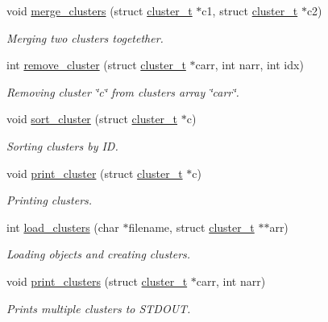\begin{DoxyCompactItemize}
void \mbox{\hyperlink{group___cluster_operations_gac39a25fdec1f4952ec92ee5407893158}{merge\+\_\+clusters}} (struct \mbox{\hyperlink{structcluster__t}{cluster\+\_\+t}} $\ast$c1, struct \mbox{\hyperlink{structcluster__t}{cluster\+\_\+t}} $\ast$c2)
\begin{DoxyCompactList}\small\item\em Merging two clusters togetether. \end{DoxyCompactList}\item 
int \mbox{\hyperlink{group___cluster_operations_gaf73744f9128e4605127b40932a730a48}{remove\+\_\+cluster}} (struct \mbox{\hyperlink{structcluster__t}{cluster\+\_\+t}} $\ast$carr, int narr, int idx)
\begin{DoxyCompactList}\small\item\em Removing cluster \char`\"{}c\char`\"{} from clusters array \char`\"{}carr\char`\"{}. \end{DoxyCompactList}\item 
void \mbox{\hyperlink{group___cluster_operations_ga12718af9e3e31b61bf703ec260e22450}{sort\+\_\+cluster}} (struct \mbox{\hyperlink{structcluster__t}{cluster\+\_\+t}} $\ast$c)
\begin{DoxyCompactList}\small\item\em Sorting clusters by ID. \end{DoxyCompactList}\item 
void \mbox{\hyperlink{group___cluster_operations_ga322bfd43ab7a3fa830cd69e79b7eef06}{print\+\_\+cluster}} (struct \mbox{\hyperlink{structcluster__t}{cluster\+\_\+t}} $\ast$c)
\begin{DoxyCompactList}\small\item\em Printing clusters. \end{DoxyCompactList}\item 
int \mbox{\hyperlink{group___cluster_operations_ga9d928923d43120cb53ddff210a087061}{load\+\_\+clusters}} (char $\ast$filename, struct \mbox{\hyperlink{structcluster__t}{cluster\+\_\+t}} $\ast$$\ast$arr)
\begin{DoxyCompactList}\small\item\em Loading objects and creating clusters. \end{DoxyCompactList}\item 
void \mbox{\hyperlink{group___cluster_operations_gad350e6021e5fead00ff2eeec4d134525}{print\+\_\+clusters}} (struct \mbox{\hyperlink{structcluster__t}{cluster\+\_\+t}} $\ast$carr, int narr)
\begin{DoxyCompactList}\small\item\em Prints multiple clusters to S\+T\+D\+O\+UT. \end{DoxyCompactList}\end{DoxyCompactItemize}


